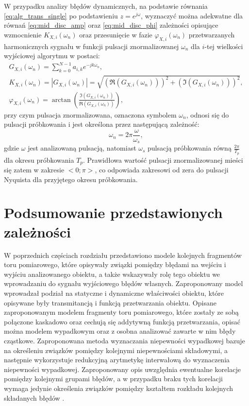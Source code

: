 W przypadku analizy błędów dynamicznych, na podstawie równania \eqref{eq:alg_trans_single} po podstawieniu $z = e^{j\omega}$, wyznaczyć można adekwatne dla równań \eqref{eq:mid_disc_amp} oraz \eqref{eq:mid_disc_phi} zależności opisujące wzmocnienie $K_{X,i}(\omega_{n})$ oraz przesunięcie w fazie $\varphi_{X,i}(\omega_{n})$ przetwarzanych harmonicznych sygnału w funkcji pulsacji znormalizowanej $\omega_{n}$ dla $i$-tej wielkości wyjściowej algorytmu w postaci:
\begin{gather}
G_{X,i} \left( \omega_{n} \right) = \sum _{k = 0} ^{N-1} a_{i,k} e^{-j k \omega_{n}} \label{eq:alg_trans_norm}, \\
K_{X,i} \left( \omega_{n} \right) = \left| G_{X,i} \left( \omega_{n} \right) \right| = \sqrt{\left( \Re \left( G_{X,i} \left( \omega_{n} \right) \right) \right)^{2} + \left( \Im \left( G_{X,i} \left( \omega_{n} \right) \right) \right)^{2}} \label{eq:alg_trans_amp}, \\
\varphi_{X,i} \left( \omega_{n} \right) = \arctan \left( \frac{\Im \left( G_{X,i} \left( \omega_{n} \right) \right)}{\Re \left( G_{X,i} \left( \omega_{n} \right) \right)} \right) \label{eq:alg_trans_phi},
\end{gather}
przy czym pulsacja znormalizowana, oznaczona symbolem $\omega_{n}$, odnosi się do pulsacji próbkowania i jest określona przez następującą zależność:
\begin{equation}
\omega_{n} = 2\pi \frac{\omega}{\omega_{s}} \label{eq:puls_norm},
\end{equation}
gdzie $\omega$ jest analizowaną pulsacją, natomiast $\omega_{s}$ pulsacją próbkowania równą $\frac{2 \pi}{T_{p}}$ dla okresu próbkowania $T_{p}$. Prawidłowa wartość pulsacji znormalizowanej mieści się zatem w zakresie $<0;\pi>$, co odpowiada zakresowi od zera do pulsacji Nyquista dla przyjętego okresu próbkowania.

\section{Podsumowanie przedstawionych zależności}

W poprzednich częściach rozdziału przedstawiono modele kolejnych fragmentów toru pomiarowego, które opisywały związki pomiędzy błędami na wejściu i wyjściu analizowanego obiektu, a także wskazywały rolę tego obiektu we wprowadzaniu do sygnału wyjściowego błędów własnych. Zaproponowany model wprowadzał podział na statyczne i dynamiczne właściwości obiektu, które opisywane były transmitancją i funkcją przetwarzania obiektu. Opisane zaproponowanym modelem fragmenty toru pomiarowego, które zostały ze sobą połączone kaskadowo oraz cechują się addytywną funkcją przetwarzania, opisać można modelem wypadkowym oraz z osobna analizować zawarte w nim błędy cząstkowe. Zaproponowana metoda wyznaczania niepewności wypadkowej bazuje na określeniu związków pomiędzy kolejnymi niepewnościami składowymi, a następnie wykorzystuje redukcyjną arytmetykę interwałową do wyznaczenia niepewności wypadkowej. Zaproponowany opis uwzględnia ewentualne korelacje pomiędzy kolejnymi grupami błędów, a w przypadku braku tych korelacji wymaga jedynie określenia związków pomiędzy kształtem rozkładu kolejnych składanych błędów \cite{jakubiec_reductive, batko_uncertainty}.

